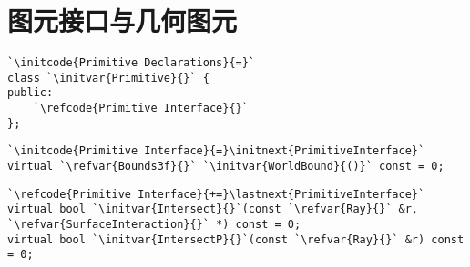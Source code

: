 \section{图元接口与几何图元}\label{sec:图元接口与几何图元}

\begin{lstlisting}
`\initcode{Primitive Declarations}{=}`
class `\initvar{Primitive}{}` {
public:
    `\refcode{Primitive Interface}{}`
};
\end{lstlisting}

\begin{lstlisting}
`\initcode{Primitive Interface}{=}\initnext{PrimitiveInterface}`
virtual `\refvar{Bounds3f}{}` `\initvar{WorldBound}{()}` const = 0;
\end{lstlisting}

\begin{lstlisting}
`\refcode{Primitive Interface}{+=}\lastnext{PrimitiveInterface}`
virtual bool `\initvar{Intersect}{}`(const `\refvar{Ray}{}` &r, `\refvar{SurfaceInteraction}{}` *) const = 0;
virtual bool `\initvar{IntersectP}{}`(const `\refvar{Ray}{}` &r) const = 0;
\end{lstlisting}
